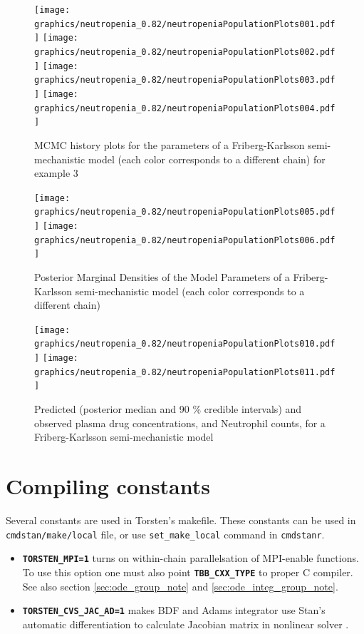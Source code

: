 \documentclass[10pt, reqno, oneside]{amsbook}
\numberwithin{equation}{chapter}
\numberwithin{figure}{chapter}
\numberwithin{table}{chapter}
\theoremstyle{remark}
\begin{document}
\begin{figure}[htbp]
\texttt{[image: graphics/neutropenia\_0.82/neutropeniaPopulationPlots001.pdf]}
\texttt{[image: graphics/neutropenia\_0.82/neutropeniaPopulationPlots002.pdf]}
\texttt{[image: graphics/neutropenia\_0.82/neutropeniaPopulationPlots003.pdf]}
\texttt{[image: graphics/neutropenia\_0.82/neutropeniaPopulationPlots004.pdf]}
\caption{{MCMC history plots for the parameters of a Friberg-Karlsson semi-mechanistic model (each color corresponds to a different chain) for example 3}}
\label{FKMCMC}
\end{figure}

\begin{figure}[htbp]
\texttt{[image: graphics/neutropenia\_0.82/neutropeniaPopulationPlots005.pdf]}
\texttt{[image: graphics/neutropenia\_0.82/neutropeniaPopulationPlots006.pdf]}
\caption{{Posterior Marginal Densities of the Model Parameters of a Friberg-Karlsson semi-mechanistic model (each color corresponds to a different chain)}}
\label{FKDens}
\end{figure}

\begin{figure}[htbp]
\texttt{[image: graphics/neutropenia\_0.82/neutropeniaPopulationPlots010.pdf]}
\texttt{[image: graphics/neutropenia\_0.82/neutropeniaPopulationPlots011.pdf]}
\caption{{Predicted (posterior median and 90 \% credible intervals) and observed plasma drug concentrations, and Neutrophil counts, for a Friberg-Karlsson semi-mechanistic model}}
\label{FKPredictions}
\end{figure}

\appendix
\chapter*{Compiling constants}
\label{sec:orgfdae2b0}
Several constants are used in Torsten's makefile. These constants can
be used in \texttt{cmdstan/make/local} file, or use \texttt{set\_make\_local} command
in \texttt{cmdstanr}.
\begin{itemize}
\item {\small \color{MRGGreen} \texttt{\textbf{TORSTEN\_MPI=1}}} turns on within-chain parallelsation of MPI-enable
functions. To use this option one must also point
{\small \color{MRGGreen} \texttt{\textbf{TBB\_CXX\_TYPE}}} to proper C compiler. See also section \ref{sec:ode_group_note} and \ref{sec:ode_integ_group_note}.
\item {\small \color{MRGGreen} \texttt{\textbf{TORSTEN\_CVS\_JAC\_AD=1}}} makes BDF and Adams
integrator use Stan's automatic differentiation to calculate
Jacobian matrix in nonlinear solver \cite{hindmarsh_cvodes_2020}.
\end{itemize}

\printindex

\backmatter



\end{document}
